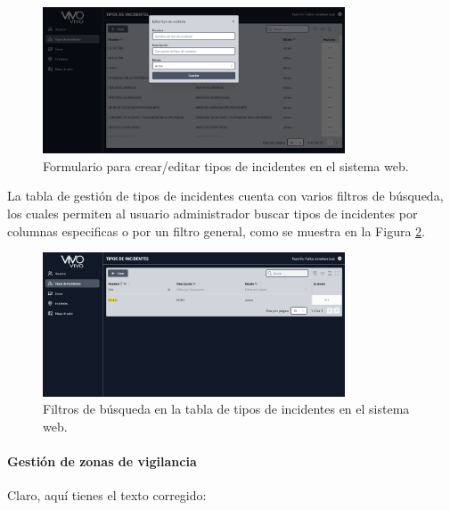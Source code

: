 \begin{figure}[H]
    \centering
    \includegraphics[width=0.8\textwidth]{chapters/III-resultados-y-discusion/resources/images/formulario-tipo-incidente-web.png}
    \caption{Formulario para crear/editar tipos de incidentes en el sistema web.}
    \label{fig:formulario-tipo-incidente-web}
\end{figure}

La tabla de gestión de tipos de incidentes cuenta con varios filtros de búsqueda, los cuales permiten al usuario administrador buscar
tipos de incidentes por columnas especificas o por un filtro general, como se muestra en la Figura \ref{fig:filtros-tabla-tipos-incidentes-web}.

\begin{figure}[H]
    \centering
    \includegraphics[width=0.8\textwidth]{chapters/III-resultados-y-discusion/resources/images/filtros-tabla-tipos-incidentes-web.png}
    \caption{Filtros de búsqueda en la tabla de tipos de incidentes en el sistema web.}
    \label{fig:filtros-tabla-tipos-incidentes-web}
\end{figure}

\paragraph{Gestión de zonas de vigilancia}

Claro, aquí tienes el texto corregido:


